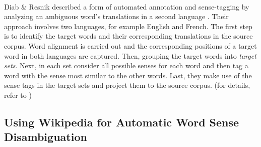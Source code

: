 \documentclass[12 pt]{article}
\begin{document}
\paragraph{}
Diab \& Resnik described a form of automated annotation and sense-tagging by analyzing an ambiguous word's translations in a second language \cite{parallel}.
Their approach involves two languages, for example English and French. The first step is to identify the target words and their corresponding translations in the source corpus. Word alignment is carried out and the corresponding positions of a target word in both languages are captured. Then, grouping the target words into \textit{target sets}.  Next, in each set consider all possible senses for each word and then tag a word with the sense most similar to the other words. Last, they make use of the sense tags in the target sets and project them to the source corpus. (for details, refer to \cite{parallel})

\subsection{Using Wikipedia for Automatic Word Sense Disambiguation}
\label{wikipedia}
\end{document}
